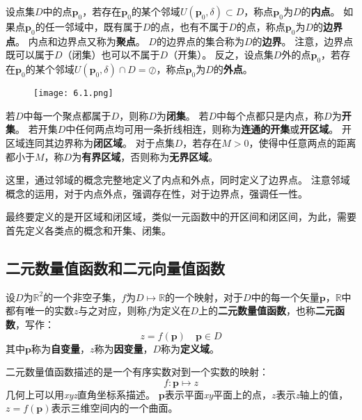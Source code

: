\begin{definition}

设点集$D$中的点$\boldsymbol{p}_0$，若存在$\boldsymbol{p}_0$的某个邻域$U\left( \boldsymbol{p}_0,\delta \right) \subset D$，称点$\boldsymbol{p}_0$为$D$的{\bf 内点}。
如果点$\boldsymbol{p}_0$的任一邻域中，既有属于$D$的点，也有不属于$D$的点，称点$\boldsymbol{p}_0$为$D$的{\bf 边界点}。
内点和边界点又称为{\bf 聚点}。
$D$的边界点的集合称为$D$的{\bf 边界}。
注意，边界点既可以属于$D$（闭集）也可以不属于$D$（开集）。
反之，设点集$D$外的点$\boldsymbol{p}_0$，若存在$\boldsymbol{p}_0$的某个邻域$U\left( \boldsymbol{p}_0,\delta \right) \cap D=\oslash $，称点$\boldsymbol{p}_0$为$D$的{\bf 外点}。
\begin{figure}[h]
\centering
\texttt{[image: 6.1.png]}
\end{figure}

若$D$中每一个聚点都属于$D$，则称$D$为{\bf 闭集}。
若$D$中每个点都只是内点，称$D$为{\bf 开集}。
若开集$D$中任何两点均可用一条折线相连，则称为{\bf 连通的开集}或{\bf 开区域}。
开区域连同其边界称为{\bf 闭区域}。
对于点集$D$，若存在$M>0$，使得中任意两点的距离都小于$M$，称$D$为{\bf 有界区域}，否则称为{\bf 无界区域}。
\end{definition}

这里，通过邻域的概念完整地定义了内点和外点，同时定义了边界点。
注意邻域概念的运用，对于内点外点，强调存在性，对于边界点，强调任一性。

最终要定义的是开区域和闭区域，类似一元函数中的开区间和闭区间，为此，需要首先定义各类点的概念和开集、闭集。

\subsection{二元数量值函数和二元向量值函数}

\begin{definition}[二元数量值函数]
设$D$为$\mathbb{R} ^2$的一个非空子集，$f$为$D\mapsto \mathbb{R} $的一个映射，对于$D$中的每一个矢量$\boldsymbol{p}$，$\mathbb{R} $中都有唯一的实数$z$与之对应，则称$f$为定义在$D$上的{\bf 二元数量值函数}，也称{\bf 二元函数}，写作：
\[
z=f\left( \boldsymbol{p} \right) \quad \boldsymbol{p}\in D
\]
其中$\boldsymbol{p}$称为{\bf 自变量}，$z$称为{\bf 因变量}，$D$称为{\bf 定义域}。
\end{definition}

二元数量值函数描述的是一个有序实数对到一个实数的映射：
\[
f:\boldsymbol{p}\mapsto z
\]
几何上可以用{\it xyz}直角坐标系描述。
$\boldsymbol{p}$表示平面{\it xy}平面上的点，$z$表示{\it z}轴上的值，$z=f\left( \boldsymbol{p} \right) $表示三维空间内的一个曲面。

